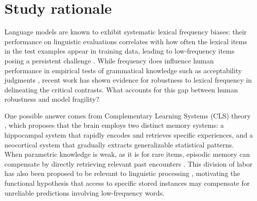 \graphicspath{{ch4/papers/RAG/}}
\providecommand{\fix}{\marginpar{FIX}}
\providecommand{\new}{\marginpar{NEW}}



\section{Study rationale}

Language models are known to exhibit systematic lexical frequency biases: their performance on linguistic evaluations correlates with how often the lexical items in the test examples appear in training data, leading to low-frequency items posing a persistent challenge \citep{wei-etal-2021-frequency,kim2022uncontrolled,diehl-martinez-etal-2024-mitigating}. While frequency does influence human performance in empirical tests of grammatical knowledge such as acceptability judgments \citep[i.a.]{kempen2005relationship,bader2010toward,lau_grammaticality_2017}, recent work \citep{christensen2024complexity} has shown evidence for robustness to lexical frequency in delineating the critical contrasts. What accounts for this gap between human robustness and model fragility?


One possible answer comes from Complementary Learning Systems (CLS) theory 
\citep{mcclelland1995there,kumaran2016learning}, which proposes that the brain employs two distinct memory systems: a hippocampal system that rapidly encodes and retrieves specific experiences, and a neocortical system that gradually extracts generalizable statistical patterns. When parametric knowledge is weak, as it is for rare items, episodic memory can compensate by directly retrieving relevant past encounters \citep{davis2009complementary}. This division of labor has also been proposed to be relevant to linguistic processing \citep{borensztajn2011episodic,duff2012hippocampus}, motivating the functional hypothesis that access to specific stored instances may compensate for unreliable predictions involving low-frequency words.

 


